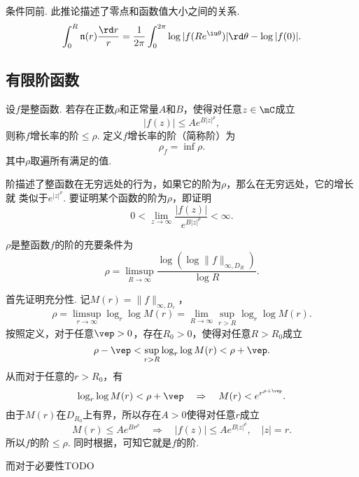   \begin{cor}
    \label{cor: 整函数、零点、模}
    条件同前. 此推论描述了零点和函数值大小之间的关系.
    \[
      \int_0^R\mathfrak{n}(r)\frac{\rd r}{r} = \frac{1}{2\pi}
      \int_0^{2\pi}\log|f(Re^{\iu\theta})|\rd\theta - \log|f(0)|.
    \]
  \end{cor}


\subsection{有限阶函数}
  \begin{defi}
    \label{defi: 整函数的阶}
    设$f$是整函数. 若存在正数$\rho$和正常量$A$和$B$，使得对任意$z\in\mC$成立
    \begin{equation}
      \label{equ: 整函数的阶、小于等于}
      |f(z)| \le Ae^{B|z|^\rho},
    \end{equation}
    则称$f$增长率的阶$\le\rho$. 定义$f$增长率的阶（简称阶）为
    \[
      \rho_f = \inf\rho.
    \]
    其中$\rho$取遍所有满足的值.
  \end{defi}
  \remark
    阶描述了整函数在无穷远处的行为，如果它的阶为$\rho$，那么在无穷远处，它的增长就
    类似于$e^{|z|^\rho}$. 要证明某个函数的阶为$\rho$，即证明
    \[
      0 < \lim_{z\to\infty}\frac{|f(z)|}{e^{B|z|^\rho}} < \infty.
    \]

  \begin{thm}[等价定义]
    $\rho$是整函数$f$的阶的充要条件为
    \[
      \rho = \limsup_{R\to\infty}\frac{\log(\log\|f\|_{\infty,D_R})}{\log R}.
    \]
  \end{thm}
  \proof
    首先证明充分性. 记$M(r) = \|f\|_{\infty, D_r}$，
    \[
      \rho = \limsup_{r\to\infty}\log_r\log M(r) = \lim_{R\to\infty}\sup_{r>R}
      \log_r\log M(r).
    \]
    按照定义，对于任意$\vep>0$，存在$R_0>0$，使得对任意$R>R_0$成立
    \begin{equation}
      \label{equ: 阶等价定义证明1}
      \rho - \vep < \sup_{r>R}\log_r\log M(r) < \rho + \vep.
    \end{equation}
    从而对于任意的$r>R_0$，有
    \[
      \log_r\log M(r) < \rho + \vep \quad\Rightarrow\quad
      M(r) < e^{r^{\rho+\vep}}.
    \]
    由于$M(r)$在$D_{R_0}$上有界，所以存在$A>0$使得对任意$r$成立
    \[
      M(r) \le Ae^{Br^\rho} \quad\Rightarrow\quad |f(z)|\le Ae^{B|z|^\rho},\quad |z|=r.
    \]
    所以$f$的阶$\le\rho$. 同时根据，可知它就是$f$的阶.\par
    而对于必要性TODO

